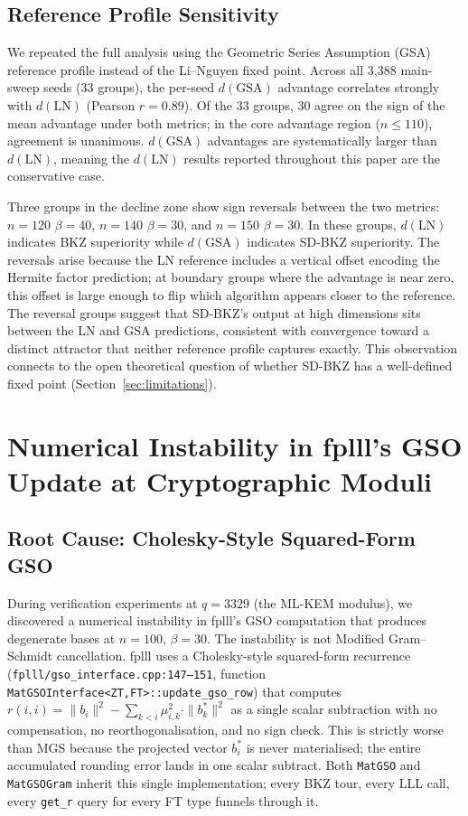 \documentclass[journal=cic,version=preprint]{iacrj}
\begin{document}
\subsection{Reference Profile Sensitivity}
\label{sec:gsa}

We repeated the full analysis using the Geometric Series Assumption (GSA) reference profile instead of the Li--Nguyen fixed point. Across all 3{,}388 main-sweep seeds (33 groups), the per-seed $d(\mathrm{GSA})$ advantage correlates strongly with $d(\mathrm{LN})$ (Pearson $r=0.89$). Of the 33 groups, 30 agree on the sign of the mean advantage under both metrics; in the core advantage region ($n\leq 110$), agreement is unanimous. $d(\mathrm{GSA})$ advantages are systematically larger than $d(\mathrm{LN})$, meaning the $d(\mathrm{LN})$ results reported throughout this paper are the conservative case.

Three groups in the decline zone show sign reversals between the two metrics: $n=120$ $\beta=40$, $n=140$ $\beta=30$, and $n=150$ $\beta=30$. In these groups, $d(\mathrm{LN})$ indicates BKZ superiority while $d(\mathrm{GSA})$ indicates SD-BKZ superiority. The reversals arise because the LN reference includes a vertical offset encoding the Hermite factor prediction; at boundary groups where the advantage is near zero, this offset is large enough to flip which algorithm appears closer to the reference. The reversal groups suggest that SD-BKZ's output at high dimensions sits between the LN and GSA predictions, consistent with convergence toward a distinct attractor that neither reference profile captures exactly. This observation connects to the open theoretical question of whether SD-BKZ has a well-defined fixed point (Section~\ref{sec:limitations}).

\section{Numerical Instability in fplll's GSO Update at Cryptographic Moduli}
\label{sec:q3329}

\subsection{Root Cause: Cholesky-Style Squared-Form GSO}

During verification experiments at $q=3329$ (the ML-KEM modulus), we discovered a numerical instability in fplll's GSO computation that produces degenerate bases at $n=100$, $\beta=30$. The instability is not Modified Gram--Schmidt cancellation. fplll uses a Cholesky-style squared-form recurrence (\texttt{fplll/gso\_interface.cpp:147--151}, function \texttt{MatGSOInterface<ZT,FT>::update\_gso\_row}) that computes $r(i,i) = \|b_i\|^2 - \sum_{k<i} \mu_{i,k}^2 \cdot \|b^*_k\|^2$ as a single scalar subtraction with no compensation, no reorthogonalisation, and no sign check. This is strictly worse than MGS because the projected vector $b^*_i$ is never materialised; the entire accumulated rounding error lands in one scalar subtract. Both \texttt{MatGSO} and \texttt{MatGSOGram} inherit this single implementation; every BKZ tour, every LLL call, every \texttt{get\_r} query for every FT type funnels through it.
\end{document}
